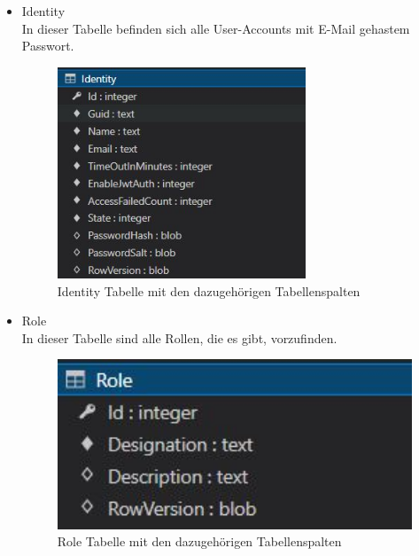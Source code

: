 \begin{itemize}
    \item Identity\\
    In dieser Tabelle befinden sich alle User-Accounts mit E-Mail gehastem Passwort.

    \begin{figure}[H]
        \centering
        \includegraphics[width=0.7\textwidth]{pics/IdentityTableStructur.JPG}
        \caption{Identity Tabelle mit den dazugehörigen Tabellenspalten}
    \end{figure}

\end{itemize}


\begin{itemize}
    \item Role\\
    In dieser Tabelle sind alle Rollen, die es gibt, vorzufinden.

    \begin{figure}[H]
        \centering
        \includegraphics[width=1\textwidth]{pics/RoleTableStructure.JPG}
        \caption{Role Tabelle mit den dazugehörigen Tabellenspalten}
    \end{figure}

\end{itemize}

